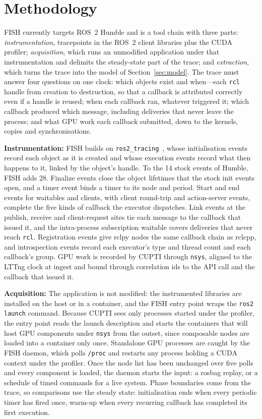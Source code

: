\section{Methodology}
\label{sec:method}
FISH currently targets ROS~2 Humble and is a tool chain with three parts: \emph{instrumentation}, tracepoints in the ROS~2 client libraries plus the CUDA profiler; \emph{acquisition}, which runs an unmodified application under that instrumentation and delimits the steady-state part of the trace; and \emph{extraction}, which turns the trace into the model of Section~\ref{sec:model}. The trace must answer four questions on one clock: which objects exist and when---each \texttt{rcl} handle from creation to destruction, so that a callback is attributed correctly even if a handle is reused; when each callback ran, whatever triggered it; which callback produced which message, including deliveries that never leave the process; and what GPU work each callback submitted, down to the kernels, copies and synchronisations.

\textbf{Instrumentation:} FISH builds on \texttt{ros2\_tracing}~\cite{bedard-2022-ros2tracing}, whose initialisation events record each object as it is created and whose execution events record what then happens to it, linked by the object's handle. To the 14 stock events of Humble, FISH adds 28. Finalize events close the object lifetimes that the stock init events open, and a timer event binds a timer to its node and period. Start and end events for waitables and clients, with client round-trip and action-server events, complete the five kinds of callback the executor dispatches. Link events at the publish, receive and client-request sites tie each message to the callback that issued it, and the intra-process subscription waitable covers deliveries that never reach \texttt{rcl}. Registration events give rclpy nodes the same callback chain as rclcpp, and introspection events record each executor's type and thread count and each callback's group. GPU work is recorded by CUPTI through \texttt{nsys}, aligned to the LTTng clock at ingest and bound through correlation ids to the API call and the callback that issued it.

\textbf{Acquisition:} The application is not modified: the instrumented libraries are installed on the host or in a container, and the FISH entry point wraps the \texttt{ros2 launch} command. Because CUPTI sees only processes started under the profiler, the entry point reads the launch description and starts the containers that will host GPU components under \texttt{nsys} from the outset, since composable nodes are loaded into a container only once. Standalone GPU processes are caught by the FISH daemon, which polls \texttt{/proc} and restarts any process holding a CUDA context under the profiler. Once the node list has been unchanged over five polls and every component is loaded, the daemon starts the input: a rosbag replay, or a schedule of timed commands for a live system. Phase boundaries come from the trace, so comparisons use the steady state: initialisation ends when every periodic timer has fired once, warm-up when every recurring callback has completed its first execution.

